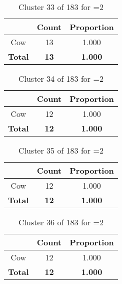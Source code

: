 \begin{table}[ht!]
\centering
\begin{tabular}{|c|c|c|}
\hline
\bf \Spec{} &\bf Count &\bf Proportion\\ \hline \hline
Cow & 13 & 1.000\\ \hline
\hline
\bf Total & \bf 13 & \bf 1.000\\ \hline
\end{tabular}
\label{tab:cluster:33:2}
\caption{Cluster 33 of 183 for \minneigh{}=2}
\end{table}

\begin{table}[ht!]
\centering
\begin{tabular}{|c|c|c|}
\hline
\bf \Spec{} &\bf Count &\bf Proportion\\ \hline \hline
Cow & 12 & 1.000\\ \hline
\hline
\bf Total & \bf 12 & \bf 1.000\\ \hline
\end{tabular}
\label{tab:cluster:34:2}
\caption{Cluster 34 of 183 for \minneigh{}=2}
\end{table}

\begin{table}[ht!]
\centering
\begin{tabular}{|c|c|c|}
\hline
\bf \Spec{} &\bf Count &\bf Proportion\\ \hline \hline
Cow & 12 & 1.000\\ \hline
\hline
\bf Total & \bf 12 & \bf 1.000\\ \hline
\end{tabular}
\label{tab:cluster:35:2}
\caption{Cluster 35 of 183 for \minneigh{}=2}
\end{table}

\begin{table}[ht!]
\centering
\begin{tabular}{|c|c|c|}
\hline
\bf \Spec{} &\bf Count &\bf Proportion\\ \hline \hline
Cow & 12 & 1.000\\ \hline
\hline
\bf Total & \bf 12 & \bf 1.000\\ \hline
\end{tabular}
\label{tab:cluster:36:2}
\caption{Cluster 36 of 183 for \minneigh{}=2}
\end{table}

